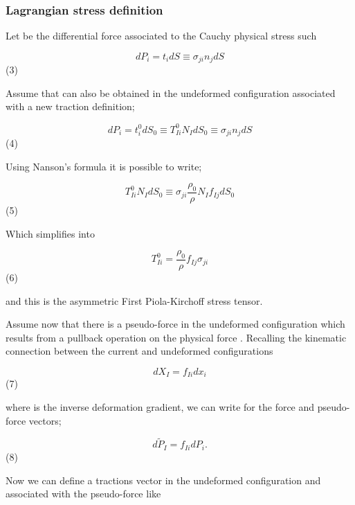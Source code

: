 \subsubsection*{Lagrangian stress definition}
Let be the differential force associated to the Cauchy physical stress such

\begin{equation}
d{P_i} = {t_i}dS \equiv {\sigma _{ji}}{n_j}dS
\label{diff stress 1}
\end{equation}	 								(3)

Assume that   can also be obtained in the undeformed configuration associated with a new traction definition;

\begin{equation}
d{P_i} = t_i^0d{S_0} \equiv T_{Ii}^0{N_I}d{S_0} \equiv {\sigma _{ji}}{n_j}dS
\label{diff stress 2}	
\end{equation} 						(4)

Using Nanson's formula it is possible to write;

\begin{equation}
T_{Ii}^0{N_I}d{S_0} \equiv {\sigma _{ji}}\frac{{{\rho _0}}}{\rho }{N_I}{f_{Ij}}d{S_0}
\label{equiv}
\end{equation}	 							(5)

Which simplifies into

\begin{equation}
T_{Ii}^0 = \frac{{{\rho _0}}}{\rho }{f_{Ij}}{\sigma _{ji}}
\label{simplified}
\end{equation}	 									(6)

and this is the asymmetric First Piola-Kirchoff stress tensor.

Assume now that there is a pseudo-force in the undeformed configuration   which results from a pullback operation on the physical force  .  Recalling the kinematic connection between the current and undeformed configurations

\begin{equation}
d{X_I} = {f_{Ii}}d{x_i}
\label{pseudo}
\end{equation}	 									(7)

where   is the inverse deformation gradient, we can write for the force and pseudo-force vectors;

\begin{equation}
d{\tilde P_I} = {f_{Ii}}d{P_i}.
\label{for and psefor}
\end{equation}									(8)

Now we can define a tractions vector   in the undeformed configuration and associated with the pseudo-force   like

